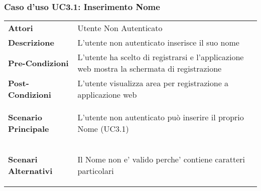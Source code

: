 \subsubsection{Caso d'uso UC3.1:  Inserimento Nome}
\label{UC3_1}

\begin{longtable}{ l | p{11cm}}
	\hline
	\rowcolor{Gray}
	 \multicolumn{2}{c}{UC3.1 - Inserimento Nome} \\
	 \hline
	\textbf{Attori} & Utente Non Autenticato \\
	\textbf{Descrizione} & L'utente non autenticato inserisce il suo nome  \\
	\textbf{Pre-Condizioni} & L'utente ha scelto di registrarsi e l'applicazione web mostra la schermata di registrazione \\
	\textbf{Post-Condizioni} & L'utente visualizza area per registrazione a applicazione web \\
	\textbf{Scenario Principale} & \begin{enumerate*}[label=(\arabic*.),itemjoin={\newline}]
		\item L'utente non autenticato può inserire il proprio Nome (UC3.1)
	\end{enumerate*}\\
	\textbf{Scenari Alternativi} & 
	\begin{enumerate*}[label=(\arabic*.),itemjoin={\newline}]
		\item Il Nome non e' valido perche' contiene caratteri particolari
	\end{enumerate*}\\
\end{longtable}